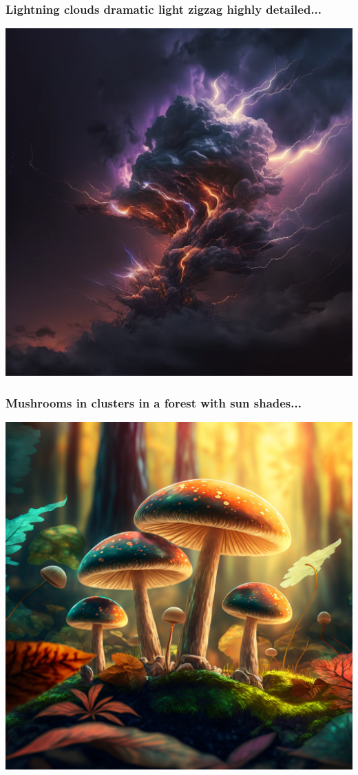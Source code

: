 \documentclass[9pt,table,xcolor=dvipsnames]{beamer}%
\theoremstyle{definition}
\theoremstyle{plain}
\begin{document}
\begin{frame}[fragile,t] %
  \frametitle{Lightning clouds dramatic light zigzag highly detailed...}
  \begin{center}
    \includegraphics[scale=0.22]{./figs/chenle02_Lightningclouds_dramatic_light_zigzag_highly_detailed.png}
  \end{center}
\end{frame}
\begin{frame}[fragile,t] %
  \frametitle{Mushrooms in clusters in a forest with sun shades...}
  \begin{center}
    \includegraphics[scale=0.22]{./figs/chenle02_Mushrooms_in_clusters_in_a_forest_with_sun_shades_ultr.png}
  \end{center}
\end{frame}
\end{document}
